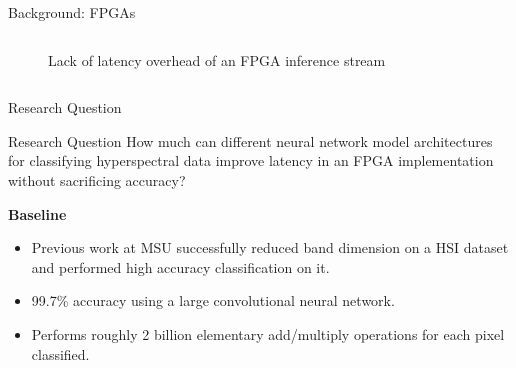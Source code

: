 \documentclass[aspectratio=169,xcolor=dvipsnames]{beamer}
\newcommand\myheading[1]{%
  \par\bigskip
  {\Large\bfseries#1}\par\smallskip}
\begin{document}
\begin{frame}{Background: FPGAs}
\begin{columns}[b]
\begin{column}{0.48\textwidth}
\begin{figure}[ht]
{
                }
                \caption{Lack of latency overhead of an FPGA inference stream}
                \label{fig:fpgadiagram}
            \end{figure}
        \end{column}
    \end{columns}
\end{frame}


\begin{frame}{Research Question}
    \begin{alertblock}{Research Question}
        How much can different neural network model architectures for classifying hyperspectral data improve latency in an FPGA implementation without sacrificing accuracy?
    \end{alertblock}
    \myheading{Baseline}
    \begin{itemize}
        \item Previous work at MSU successfully reduced band dimension on a HSI dataset and performed high accuracy classification on it.
        \item 99.7\% accuracy using a large convolutional neural network.
        \item Performs roughly 2 billion elementary add/multiply operations for each pixel classified.
    \end{itemize}
\end{frame}
\end{document}
